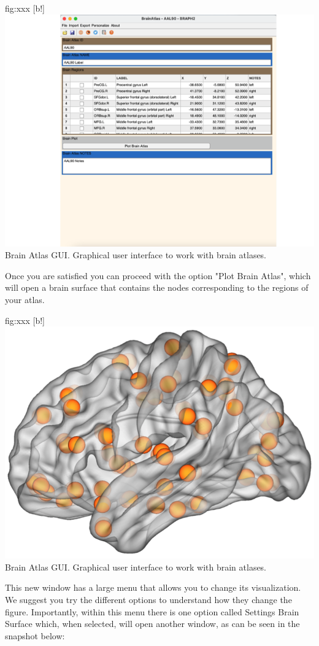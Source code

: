 \documentclass{tufte-handout}
\begin{document}
	{fig:xxx}
	{
	[b!]
	\includegraphics{tut_ba/fig8.png}
	}
	{Brain Atlas GUI.}
	{
	Graphical user interface to work with brain atlases. 
	}

Once you are satisfied you can proceed with the option "Plot Brain Atlas", which will open a brain surface that contains the nodes corresponding to the regions of your atlas.

	{fig:xxx}
	{
	[b!]
	\includegraphics{tut_ba/fig2.png}
	}
	{Brain Atlas GUI.}
	{
	Graphical user interface to work with brain atlases. 
	}
	
This new window has a large menu that allows you to change its visualization. We suggest you try the different options to understand how they change the figure. Importantly, within this menu there is one option called Settings Brain Surface which, when selected, will open another window, as can be seen in the snapshot below:
\end{document}
